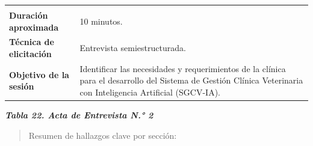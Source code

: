 \documentclass[
]{article}
\begin{document}
{\begin{longtable}[]{@{}
  >{\raggedright\arraybackslash}p{}
  >{\raggedright\arraybackslash}p{}@{}}
\begin{minipage}[t]{\linewidth}
\end{minipage} \\
\textbf{Duración} \textbf{aproximada} & \begin{minipage}[t]{\linewidth}\raggedright
10 minutos.
\end{minipage} \\
\textbf{Técnica de} \textbf{elicitación} & \begin{minipage}[t]{\linewidth}\raggedright
Entrevista semiestructurada.
\end{minipage} \\
\textbf{Objetivo de la} \textbf{sesión} & \begin{minipage}[t]{\linewidth}\raggedright
Identificar las necesidades y requerimientos de la clínica para el
desarrollo del Sistema de Gestión Clínica Veterinaria con Inteligencia Artificial (SGCV-IA).
\end{minipage} \\
\end{longtable}
}

\protect{}\label{_bookmark81}{}\emph{\textbf{Tabla 22. Acta
de Entrevista N.° 2}}

\begin{quote}
Resumen de hallazgos clave por sección:
\end{quote}
\end{document}
